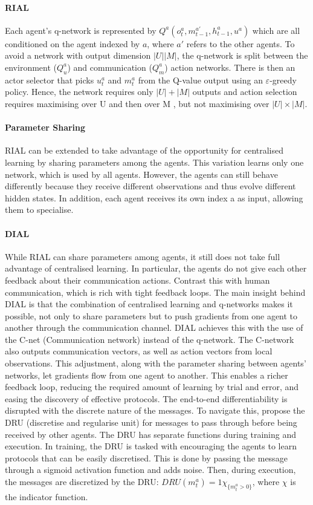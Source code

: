 \documentclass{article}
\begin{document}
\paragraph{RIAL} Each agent's q-network is represented by $Q^a(o_t^a, m_{t-1}^{a'}, h_{t-1}^{a}, u^a)$ which are all conditioned on the agent indexed by $a$, where $a'$ refers to the other agents. To avoid a network with output dimension $|U||M|$, the q-network is split between the environment ($Q^a_u$) and communication ($Q^a_m$) action networks. There is then an actor selector that picks $u_t^a$ and $m_t^a$ from the Q-value output using an $\varepsilon$-greedy policy. Hence, the network requires only $|U| + |M|$ outputs and action selection requires maximising over U and then over M , but not maximising over $|U| \times |M|$.

\paragraph{Parameter Sharing} RIAL can be extended to take advantage of the opportunity for centralised learning by sharing parameters among the agents. This variation learns only one network, which is used by all agents. However, the agents can still behave differently because they receive different observations and thus evolve different hidden states. In addition, each agent receives its own index a as input, allowing them to specialise.

\paragraph{DIAL} While RIAL can share parameters among agents, it still does not take full advantage of centralised learning. In particular, the agents do not give each other feedback about their communication actions. Contrast this with human communication, which is rich with tight feedback loops. The main insight behind DIAL is that the combination of centralised learning and q-networks makes it possible, not only to share parameters but to push gradients from one agent to another through the communication channel. DIAL achieves this with the use of the C-net (Communication network) instead of the q-network. The C-network also outputs communication vectors, as well as action vectors from local observations. This adjustment, along with the parameter sharing between agents' networks, let gradients flow from one agent to another. This enables a richer feedback loop, reducing the required amount of learning by trial and error, and easing the discovery of effective protocols. The end-to-end differentiability is disrupted with the discrete nature of the messages. To navigate this, \citet{foerster2016learning} propose the DRU (discretise and regularise unit) for messages to pass through before being received by other agents. The DRU has separate functions during training and execution. In training, the DRU is tasked with encouraging the agents to learn protocols that can be easily discretised. This is done by passing the message through a sigmoid activation function and adds noise. Then, during execution, the messages are discretized by the DRU: $DRU(m_t^a) = 1\chi_{\{ m_t^a > 0 \}}$, where $\chi$ is the indicator function.
\end{document}

